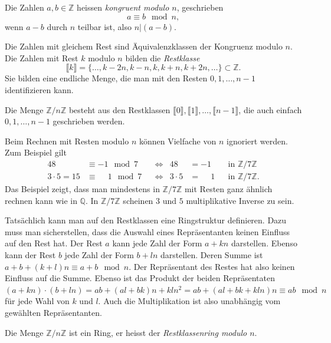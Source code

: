 \begin{definition}
Die Zahlen $a,b\in\mathbb{Z}$ heissen {\em kongruent modulo $n$},
%
geschrieben
\[
a\equiv b\mod n,
\]
wenn $a-b$ durch $n$ teilbar ist, also $n|(a-b)$.
\end{definition}

Die Zahlen mit gleichem Rest sind Äquivalenzklassen der Kongruenz modulo $n$.
Die Zahlen mit Rest $k$ modulo $n$ bilden die {\em Restklasse}
%
\[
\llbracket k\rrbracket=\{\dots,k-2n,k-n,k,k+n,k+2n,\dots\} \subset\mathbb{Z}.
\]
Sie bilden eine endliche Menge, die man mit den Resten $0,1,\dots,n-1$
identifizieren kann.

\begin{definition}
Die Menge $\mathbb{Z}/n\mathbb{Z}$ besteht aus den Restklassen
$\llbracket 0\rrbracket,\llbracket 1\rrbracket,\dots,\llbracket n-1\rrbracket$,
die auch einfach $0,1,\dots,n-1$ geschrieben werden.
\end{definition}

Beim Rechnen mit Resten modulo $n$ können Vielfache von $n$ ignoriert werden.
Zum Beispiel gilt 
\[
\begin{aligned}
48&\equiv -1\mod 7&&\Leftrightarrow& 48&=-1&&\text{in $\mathbb{Z}/7\mathbb{Z}$}
\\
3\cdot 5=15&\equiv\phantom{-}1\mod 7&&\Leftrightarrow & 3\cdot 5&=\phantom{-}1&&\text{in $\mathbb{Z}/7\mathbb{Z}$.}
\end{aligned}
\]
Das Beispiel zeigt, dass man mindestens in $\mathbb{Z}/7\mathbb{Z}$ mit
Resten ganz ähnlich rechnen kann wie in $\mathbb{Q}$.
In $\mathbb{Z}/7\mathbb{Z}$ scheinen $3$ und $5$ multiplikative Inverse
zu sein.

Tatsächlich kann man auf den Restklassen eine Ringstruktur definieren.
Dazu muss man sicherstellen, dass die Auswahl eines Repräsentanten keinen
Einfluss auf den Rest hat.
Der Rest $a$ kann jede Zahl der Form $a+kn$ darstellen.
Ebenso kann der Rest $b$ jede Zahl der Form $b+ln$ darstellen.
Deren Summe ist $a+b+(k+l)n\equiv a+b\mod n$.
Der Repräsentant des Restes hat also keinen Einfluss auf die Summe.
Ebenso ist das Produkt der beiden Repräsentaten 
$(a+kn)\cdot(b+ln) = ab + (al+bk)n + kln^2=ab + (al+bk+kln)n\equiv ab\mod n$
für jede Wahl von $k$ und $l$.
Auch die Multiplikation ist also unabhängig vom gewählten Repräsentanten.

\begin{definition}
Die Menge $\mathbb{Z}/n\mathbb{Z}$ ist ein Ring,
er heisst der {\em Restklassenring modulo $n$}.
\end{definition}

